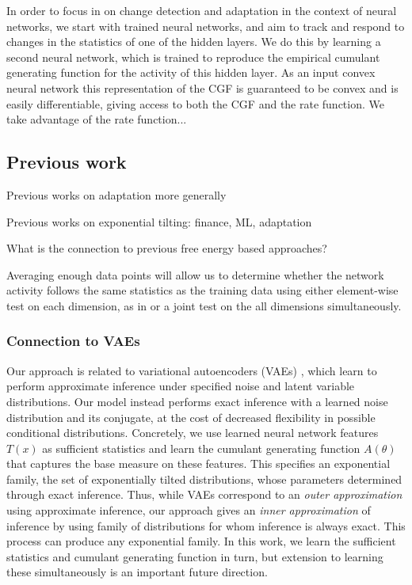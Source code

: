 \documentclass[10pt]{article}      %
\begin{document}
In order to focus in on change detection and adaptation in the context of neural networks, we start with trained neural networks, and aim to track and respond to changes in the statistics of one of the hidden layers. 
We do this by learning a second neural network, which is trained to reproduce the empirical cumulant generating function for the activity of this hidden layer.
As an input convex neural network \cite{amos_input_2017} this representation of the CGF is guaranteed to be convex and is easily differentiable, giving access to both the CGF and the rate function.
We take advantage of the rate function...





\subsection{Previous work}

Previous works on adaptation more generally

Previous works on exponential tilting: finance, ML, adaptation 


What is the connection to previous free energy based approaches?


Averaging enough data points will allow us to determine whether the network activity follows the same statistics as the training data using either element-wise test on each dimension, as in \cite{rabanser_failing_2019} or a joint test on the all dimensions simultaneously.


\subsubsection{Connection to VAEs}

Our approach is related to variational autoencoders (VAEs) \cite{kingma_auto-encoding_2013}, which learn to perform approximate inference under specified noise and latent variable distributions. 
Our model instead performs exact inference with a learned noise distribution and its conjugate, at the cost of decreased flexibility in possible conditional distributions.
Concretely, we use learned neural network features $T(x)$ as sufficient statistics and learn the cumulant generating function $A(\theta)$ that captures the base measure on these features.
This specifies an exponential family, the set of exponentially tilted distributions, whose parameters determined through exact inference.
Thus, while VAEs correspond to an \textit{outer approximation} using approximate inference, our approach gives an \textit{inner approximation} of inference by using family of distributions for whom inference is always exact.
This process can produce any exponential family.
In this work, we learn the sufficient statistics and cumulant generating function in turn, but extension to learning these simultaneously is an important future direction.
\end{document}
